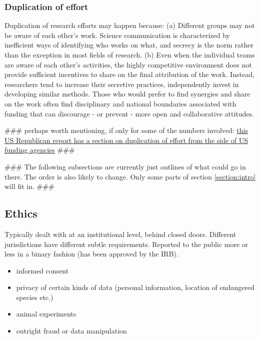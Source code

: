 \documentclass[final,authoryear,3p]{elsarticle-open-drafting}
\begin{document}
\subsubsection{Duplication of effort}

Duplication of research efforts may happen because:
(a) Different groups may not be aware of each other's work. Science communication is characterized by inefficient ways of identifying who works on what, and secrecy is the norm rather than the exception in most fields of research.
(b) Even when the individual teams are aware of each other's activities, the highly competitive environment does not provide sufficient incentives to share on the final attribution of the work. Instead, researchers tend to increase their secretive practices, independently invest in developing similar methods. Those who would prefer to find synergies and share on the work often find disciplinary and national boundaries associated with funding that can discourage - or prevent - more open and collaborative attitudes. 

\#\#\# perhaps worth mentioning, if only for some of the numbers involved: \href{http://coburn.senate.gov/public/index.cfm/2011/5/dr-coburn-releases-new-oversight-report-exposing-waste-mismanagement-at-the-national-science-foundation}{this US Republican report has a section on duplication of effort from the side of US funding agencies} \#\#\#

\#\#\# The following subsections are currently just outlines of what could go in there. The order is also likely to change. Only some parts of section \ref{section:intro} will fit in. \#\#\#

\subsection{Ethics}
Typically dealt with at an institutional level, behind closed doors. Different jurisdictions have different subtle requirements. Reported to the public more or less in a binary fashion (has been approved by the IRB). 

\begin{itemize}
	\item informed consent
	\item privacy of certain kinds of data (personal information, location of endangered species etc.)
	\item animal experiments
	\item outright fraud or data manipulation
\end{itemize}
\end{document}
